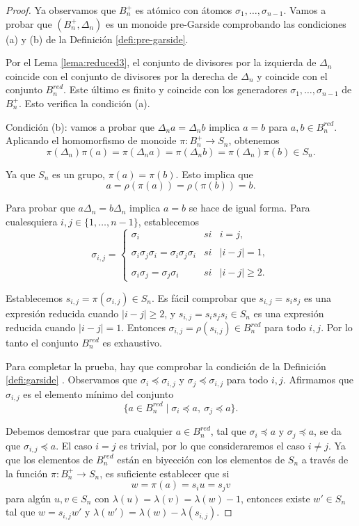 \documentclass[12pt]{book}
\theoremstyle{definition}
\begin{document}
\begin{proof} Ya observamos que $B_n^+$ es atómico con átomos $\sigma_1,\ldots,\sigma_{n-1}$. Vamos a probar que $(B_n^+,\Delta_n)$ es un monoide pre-Garside comprobando las condiciones (a) y (b) de la Definición \ref{defi:pre-garside}.

Por el Lema \ref{lema:reduced3}, el conjunto de divisores por la izquierda de $\Delta_n$ coincide con el conjunto de divisores por la derecha de $\Delta_n$ y coincide con el conjunto $B_n^{red}$. Este último es finito y coincide con los generadores $\sigma_1,\ldots,\sigma_{n-1}$ de $B_n^+$. Esto verifica la condición (a).

Condición (b): vamos a probar que $\Delta_n a=\Delta_n b$ implica $ a=b$ para $a,b\in B_n^{red}.$ Aplicando el homomorfismo de monoide $\pi: B_n^+\rightarrow S_n$, obtenemos
$$\pi(\Delta_n)\pi(a)=\pi(\Delta_n a)=\pi(\Delta_n b)=\pi(\Delta_n)\pi(b)\in S_n.$$

Ya que $S_n$ es un grupo, $\pi(a)=\pi(b)$. Esto implica que
$$a=\rho(\pi(a))=\rho(\pi(b))=b.$$

Para probar que $a\Delta_n=b\Delta_n$ implica $ a=b$ se hace de igual forma.
Para cualesquiera $i,j\in\{1,\ldots,n-1\}$, establecemos
$$\sigma_{i,j}= \left\{ \begin{array}{lcc}
             \sigma_i &   si  & i=j, \\
             \\ \sigma_i\sigma_j\sigma_i=\sigma_i\sigma_j\sigma_i &  si & |i-j|=1, \\
             \\ \sigma_i\sigma_j=\sigma_j\sigma_i &  si  & |i-j|\geq 2.
             \end{array}
   \right.$$
   
Establecemos $s_{i,j}=\pi(\sigma_{i,j})\in S_n$. Es fácil comprobar que $s_{i,j}=s_is_j$ es una expresión reducida cuando $|i-j|\geq 2$, y $s_{i,j}=s_is_js_i\in S_n$ es una expresión reducida cuando $|i-j|=1$. Entonces $\sigma_{i,j}=\rho(s_{i,j})\in B_n^{red}$ para todo $i,j$. Por lo tanto el conjunto $B_n^{red}$ es exhaustivo.

Para completar la prueba, hay que comprobar la condición de la Definición \ref{defi:garside}
. Observamos que $\sigma_i\preceq \sigma_{i,j}$ y $\sigma_j\preceq\sigma_{i,j}$ para todo $i,j$. Afirmamos que $\sigma_{i,j}$ es el elemento mínimo del conjunto
$$\{a\in B_n^{red}\mid\sigma_i\preceq a,\ \sigma_j\preceq a\}.$$

Debemos demostrar que para cualquier $a\in B_n^{red}$, tal que $\sigma_i\preceq a$ y $\sigma_j\preceq a$, se da que $\sigma_{i,j}\preceq a$. El caso $i=j$ es trivial, por lo que consideraremos el caso $i\neq j$. Ya que los elementos de $B_n^{red}$ están en biyección con los elementos de $S_n$ a través de la función $\pi: B_n^+\rightarrow S_n$, es suficiente establecer que si
$$w=\pi(a)=s_iu=s_jv$$
para algún $u,v\in S_n$ con $\lambda(u)=\lambda(v)=\lambda(w)-1$, entonces existe $w'\in S_n$ tal que $w=s_{i,j}w'$ y $\lambda(w')=\lambda(w)-\lambda(s_{i,j})$.


\end{proof}
\end{document}
